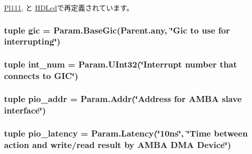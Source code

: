 \hyperlink{classRealView_1_1Pl111_a17da7064bc5c518791f0c891eff05fda}{Pl111}, と \hyperlink{classRealView_1_1HDLcd_a17da7064bc5c518791f0c891eff05fda}{HDLcd}で再定義されています。\hypertarget{classRealView_1_1AmbaDmaDevice_a40243beb62d217c3a9e35801ae739fd0}{
\subsubsection[{gic}]{\setlength{\rightskip}{0pt plus 5cm}tuple {\bf gic} = Param.BaseGic(Parent.any, \char`\"{}Gic to use for interrupting\char`\"{})}}
\label{classRealView_1_1AmbaDmaDevice_a40243beb62d217c3a9e35801ae739fd0}
\hypertarget{classRealView_1_1AmbaDmaDevice_a65fded6db751c1b9aa7168b29056e819}{
\subsubsection[{int\_\-num}]{\setlength{\rightskip}{0pt plus 5cm}tuple {\bf int\_\-num} = Param.UInt32(\char`\"{}Interrupt number that connects to GIC\char`\"{})}}
\label{classRealView_1_1AmbaDmaDevice_a65fded6db751c1b9aa7168b29056e819}
\hypertarget{classRealView_1_1AmbaDmaDevice_aac8239d62c5a04a05fcc71d4ac63fdb4}{
\subsubsection[{pio\_\-addr}]{\setlength{\rightskip}{0pt plus 5cm}tuple {\bf pio\_\-addr} = {\bf Param.Addr}(\char`\"{}Address for AMBA slave interface\char`\"{})}}
\label{classRealView_1_1AmbaDmaDevice_aac8239d62c5a04a05fcc71d4ac63fdb4}
\hypertarget{classRealView_1_1AmbaDmaDevice_ac3f272675842a6662ce8782e10fdba39}{
\subsubsection[{pio\_\-latency}]{\setlength{\rightskip}{0pt plus 5cm}tuple {\bf pio\_\-latency} = Param.Latency(\char`\"{}10ns\char`\"{}, \char`\"{}Time between action and write/read result by AMBA DMA Device\char`\"{})}}
